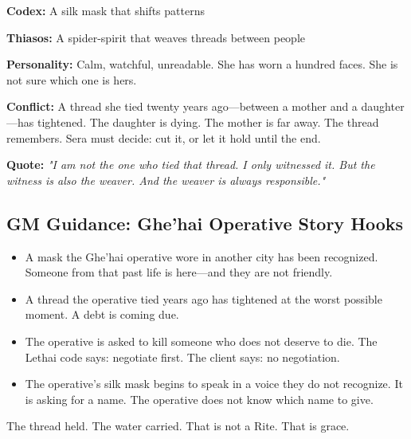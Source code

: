 \textbf{Codex:} A silk mask that shifts patterns

\textbf{Thiasos:} A spider-spirit that weaves threads between people

\textbf{Personality:} Calm, watchful, unreadable. She has worn a hundred faces. She is not sure which one is hers.

\textbf{Conflict:} A thread she tied twenty years ago—between a mother and a daughter—has tightened. The daughter is dying. The mother is far away. The thread remembers. Sera must decide: cut it, or let it hold until the end.

\textbf{Quote:} \textit{"I am not the one who tied that thread. I only witnessed it. But the witness is also the weaver. And the weaver is always responsible."}

\subsection{GM Guidance: Ghe'hai Operative Story Hooks}

\begin{itemize}
\item A mask the Ghe'hai operative wore in another city has been recognized. Someone from that past life is here—and they are not friendly.
\item A thread the operative tied years ago has tightened at the worst possible moment. A debt is coming due.
\item The operative is asked to kill someone who does not deserve to die. The Lethai code says: negotiate first. The client says: no negotiation.
\item The operative's silk mask begins to speak in a voice they do not recognize. It is asking for a name. The operative does not know which name to give.
\end{itemize}

The thread held. The water carried. That is not a Rite. That is grace.
